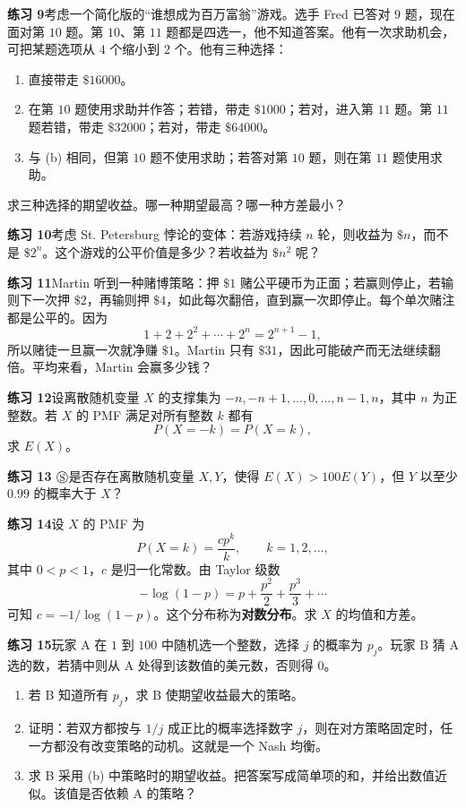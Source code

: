 \documentclass[UTF8,12pt,a4paper,fontset=fandol]{ctexart}
\begin{document}
\noindent\textbf{练习 9}\quad 考虑一个简化版的“谁想成为百万富翁”游戏。选手 Fred 已答对 $9$ 题，现在面对第 $10$ 题。第 $10$、第 $11$ 题都是四选一，他不知道答案。他有一次求助机会，可把某题选项从 $4$ 个缩小到 $2$ 个。他有三种选择：
\begin{enumerate}
  \item[(a)] 直接带走 $\$16000$。
  \item[(b)] 在第 $10$ 题使用求助并作答；若错，带走 $\$1000$；若对，进入第 $11$ 题。第 $11$ 题若错，带走 $\$32000$；若对，带走 $\$64000$。
  \item[(c)] 与 (b) 相同，但第 $10$ 题不使用求助；若答对第 $10$ 题，则在第 $11$ 题使用求助。
\end{enumerate}
求三种选择的期望收益。哪一种期望最高？哪一种方差最小？

\noindent\textbf{练习 10}\quad 考虑 St. Petersburg 悖论的变体：若游戏持续 $n$ 轮，则收益为 $\$n$，而不是 $\$2^n$。这个游戏的公平价值是多少？若收益为 $\$n^2$ 呢？

\noindent\textbf{练习 11}\quad Martin 听到一种赌博策略：押 $\$1$ 赌公平硬币为正面；若赢则停止，若输则下一次押 $\$2$，再输则押 $\$4$，如此每次翻倍，直到赢一次即停止。每个单次赌注都是公平的。因为
\[
  1+2+2^2+\cdots+2^n=2^{n+1}-1,
\]
所以赌徒一旦赢一次就净赚 $\$1$。Martin 只有 $\$31$，因此可能破产而无法继续翻倍。平均来看，Martin 会赢多少钱？

\noindent\textbf{练习 12}\quad 设离散随机变量 $X$ 的支撑集为 $-n,-n+1,\ldots,0,\ldots,n-1,n$，其中 $n$ 为正整数。若 $X$ 的 PMF 满足对所有整数 $k$ 都有
\[
  P(X=-k)=P(X=k),
\]
求 $E(X)$。

\noindent\textbf{练习 13 $\circledS$}\quad 是否存在离散随机变量 $X,Y$，使得 $E(X)>100E(Y)$，但 $Y$ 以至少 $0.99$ 的概率大于 $X$？

\noindent\textbf{练习 14}\quad 设 $X$ 的 PMF 为
\[
  P(X=k)=\frac{cp^k}{k},\qquad k=1,2,\ldots,
\]
其中 $0<p<1$，$c$ 是归一化常数。由 Taylor 级数
\[
  -\log(1-p)=p+\frac{p^2}{2}+\frac{p^3}{3}+\cdots
\]
可知 $c=-1/\log(1-p)$。这个分布称为\textbf{对数分布}。求 $X$ 的均值和方差。

\noindent\textbf{练习 15}\quad 玩家 A 在 $1$ 到 $100$ 中随机选一个整数，选择 $j$ 的概率为 $p_j$。玩家 B 猜 A 选的数，若猜中则从 A 处得到该数值的美元数，否则得 $0$。
\begin{enumerate}
  \item[(a)] 若 B 知道所有 $p_j$，求 B 使期望收益最大的策略。
  \item[(b)] 证明：若双方都按与 $1/j$ 成正比的概率选择数字 $j$，则在对方策略固定时，任一方都没有改变策略的动机。这就是一个 Nash 均衡。
  \item[(c)] 求 B 采用 (b) 中策略时的期望收益。把答案写成简单项的和，并给出数值近似。该值是否依赖 A 的策略？
\end{enumerate}
\end{document}
